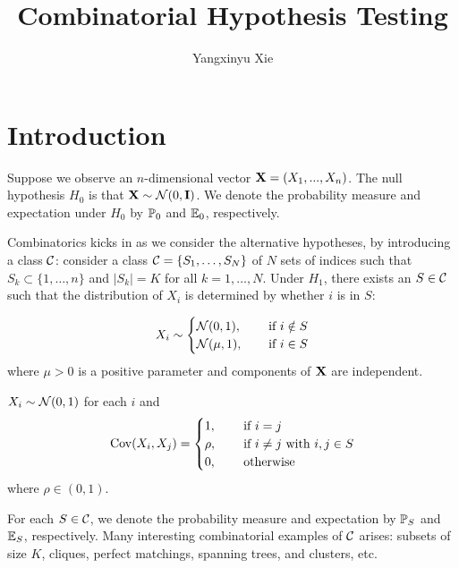 \documentclass[10pt, oneside]{article}
\begin{document}
\thispagestyle{empty}
\title{Combinatorial Hypothesis Testing}
\author{Yangxinyu Xie}



\maketitle
\addtocounter{footnote}{-1}\let\thefootnote\svthefootnote

\section{Introduction}

Suppose we observe an $n$-dimensional vector $\mathbf{X} = (X_1,...,X_n)$. The null hypothesis $H_0$ is that $\mathbf{X} \sim {\mathcal N}(0, \mathbf{I})$. We denote the probability measure and expectation under $H_0$ by $\mathbb{P}_0$ and $\mathbb{E}_0$, respectively.

Combinatorics kicks in as we consider the alternative hypotheses, by introducing a class ${\mathcal C}$: consider a class ${\mathcal C}=\{S_1,\ldots,S_N\}$ of $N$ sets of indices such that $S_k \subset\{1,\ldots,n\}$ and $|S_k| = K$ for all $k=1,\ldots,N$. Under $H_1$, there
exists an $S \in {\mathcal C}$ such that the distribution of $X_i$ is determined by whether $i$ is in $S$:
\begin{alt}
  \label{alt:mean}
$$
X_i \sim
\begin{cases}
  {\mathcal N}(0,1), \quad & \mbox{ if }i \notin S\\
  {\mathcal N}(\mu,1), & \mbox{ if }i \in S
\end{cases}
$$
where $\mu>0$ is a positive parameter and components of $\mathbf{X}$ are independent. 
\end{alt}
\begin{alt}
  \label{alt:correlation}
  $X_i \sim {\mathcal N}(0,1)$ for each $i$ and 
  $$
  \operatorname{Cov}(X_i, X_j) =
  \begin{cases}
    1, \quad & \mbox{ if }i = j\\
    \rho, & \mbox{ if }i \neq j\mbox{ with }i, j \in S\\
    0, & \mbox{ otherwise}\\
  \end{cases}
  $$
  where $\rho \in (0,1).$
\end{alt}

For each $S \in {\mathcal C}$, we denote the probability measure and expectation by $\mathbb{P}_S$ and $\mathbb{E}_S$, respectively. Many interesting combinatorial examples of ${\mathcal C}$ arises: subsets of size $K$, cliques, perfect matchings, spanning trees, and clusters, etc.
\end{document}
